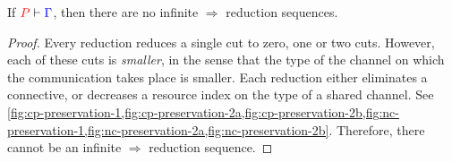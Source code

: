 \begin{theorem}[Termination]\label{thm:nc-termination}
  If $\seq[{ P }]{ \Gamma }$, then there are no infinite $\Longrightarrow$
  reduction sequences.
\end{theorem}
\begin{proof}
  Every reduction reduces a single cut to zero, one or two cuts.
  However, each of these cuts is \emph{smaller}, in the sense that the type of
  the channel on which the communication takes place is smaller.
  Each reduction either eliminates a connective, or decreases a resource index
  on the type of a shared channel.
  See
  \cref{fig:cp-preservation-1,fig:cp-preservation-2a,fig:cp-preservation-2b,fig:nc-preservation-1,fig:nc-preservation-2a,fig:nc-preservation-2b}.
  Therefore, there cannot be an infinite $\Longrightarrow$ reduction sequence.
\end{proof}
